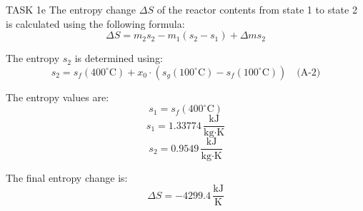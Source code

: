 TASK 1e  
The entropy change \( \Delta S \) of the reactor contents from state 1 to state 2 is calculated using the following formula:  
\[
\Delta S = m_2 s_2 - m_1 (s_2 - s_1) + \Delta m s_2
\]  

The entropy \( s_2 \) is determined using:  
\[
s_2 = s_f(400^\circ\text{C}) + x_0 \cdot \left( s_g(100^\circ\text{C}) - s_f(100^\circ\text{C}) \right) \quad \text{(A-2)}
\]  

The entropy values are:  
\[
s_1 = s_f(400^\circ\text{C})
\]  
\[
s_1 = 1.33774 \, \frac{\text{kJ}}{\text{kg·K}}
\]  
\[
s_2 = 0.9549 \, \frac{\text{kJ}}{\text{kg·K}}
\]  

The final entropy change is:  
\[
\Delta S = -4299.4 \, \frac{\text{kJ}}{\text{K}}
\]